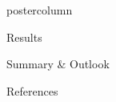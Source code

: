 \documentclass{beamer}
\newlength{\columnheight}
\begin{document}
\begin{frame}
\begin{columns}
  \begin{column}{.37\textwidth}
    \begin{beamercolorbox}[center]{postercolumn}
      \begin{minipage}{.98\textwidth} %
        \parbox[t][\columnheight]{\textwidth}{ %
            \begin{myblock}{Results}
            \end{myblock}
            \begin{myblock}{Summary \& Outlook}
            \end{myblock}
            \begin{myblock}{References}
                \footnotesize
                
                
            \end{myblock}\vfill
      }\end{minipage}\end{beamercolorbox}
  \end{column}

  \begin{column}{0.01\textwidth}
  \end{column}

\end{columns}
\end{frame}
\end{document}

